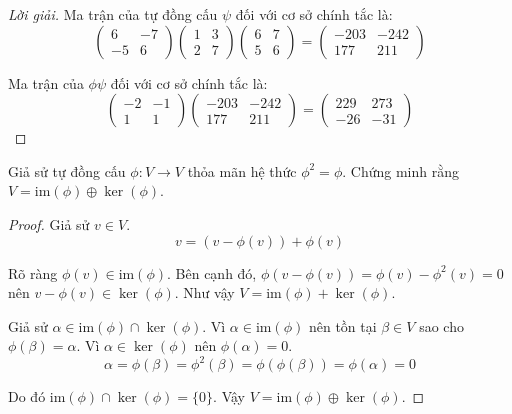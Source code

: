 \begin{proof}[Lời giải]
    Ma trận của tự đồng cấu $\psi$ đối với cơ sở chính tắc là:
    \[
        \begin{pmatrix}
            6  & -7 \\
            -5 & 6
        \end{pmatrix}
        \begin{pmatrix}
            1 & 3 \\
            2 & 7
        \end{pmatrix}
        \begin{pmatrix}
            6 & 7 \\
            5 & 6
        \end{pmatrix}=
        \begin{pmatrix}
            -203 & -242 \\
            177  & 211
        \end{pmatrix}
    \]
    
    Ma trận của $\phi\psi$ đối với cơ sở chính tắc là:
    \[
        \begin{pmatrix}
            -2 & -1 \\
            1  & 1
        \end{pmatrix}
        \begin{pmatrix}
            -203 & -242 \\
            177  & 211
        \end{pmatrix}=
        \begin{pmatrix}
            229 & 273 \\
            -26 & -31
        \end{pmatrix}
    \]
\end{proof}

\begin{exercise}
    Giả sử tự đồng cấu $\phi: V\to V$ thỏa mãn hệ thức $\phi^{2} = \phi$. Chứng minh rằng $V = \text{im}(\phi)\oplus\ker(\phi)$.
\end{exercise}

\begin{proof}
    Giả sử $v\in V$.
    \[
        v = (v - \phi(v)) + \phi(v)
    \]
    
    Rõ ràng $\phi(v)\in\text{im}(\phi)$. Bên cạnh đó, $\phi(v - \phi(v)) = \phi(v) - \phi^{2}(v) = 0$ nên $v - \phi(v)\in\ker(\phi)$. Như vậy $V = \text{im}(\phi)+\ker(\phi)$.
    
    \bigskip
    
    Giả sử $\alpha\in\text{im}(\phi)\cap\ker(\phi)$. Vì $\alpha\in\text{im}(\phi)$ nên tồn tại $\beta\in V$ sao cho $\phi(\beta) = \alpha$. Vì $\alpha\in\ker(\phi)$ nên $\phi(\alpha) = 0$.
    \[
        \alpha = \phi(\beta) = \phi^{2}(\beta) = \phi(\phi(\beta)) = \phi(\alpha) = 0
    \]
    
    Do đó $\text{im}(\phi)\cap\ker(\phi) = \{ 0 \}$. Vậy $V = \text{im}(\phi)\oplus\ker(\phi)$.
\end{proof}

